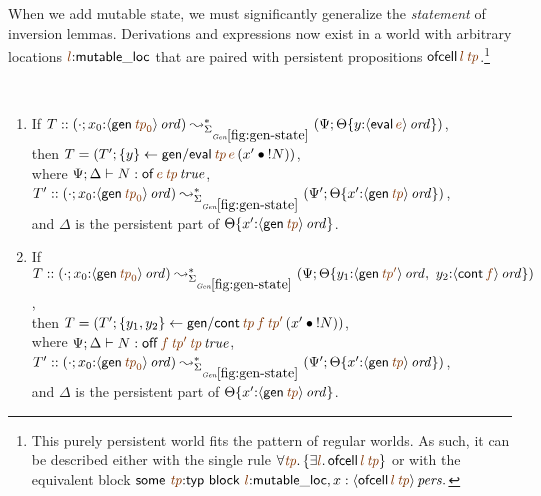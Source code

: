 When we add mutable state, we must significantly generalize the 
{\it statement} of inversion lemmas. Derivations and
expressions now exist in a world with arbitrary locations $\lf{l}{:}{\sf
  mutable\_loc}$ that are paired with persistent propositions
${{\sf ofcell}\,\lf{l}\,\lf{\it tp}}$.\footnote{This purely persistent
world fits the pattern of regular worlds. 
As such, it can be described either with the
single rule
$\forall \lf{\it tp}.\,\{ \exists \lf{l}.\,{\sf
    ofcell}\,\lf{l}\,\lf{\it tp}\}$ or with the equivalent block
${\sf some} ~ \lf{\it tp}{:}{\sf
  typ} ~ {\sf block} ~ \lf{l}{:}{\sf mutable\_loc}, x : \ispers{\susp{{\sf
    ofcell}\,\lf{l}\,\lf{\it tp}}}.$}

\bigskip
\begin{lemma}~
\begin{enumerate}
\item If 
   $T :: (\cdot; x_0{:}\istrue{\susp{{\sf gen}\,\lf{{\it tp}_0}}})
         \leadsto^*_{\siggenstate}
         (\Psi; \tackon{\Theta}
            {y{:}\istrue{\susp{{\sf eval}\,\lf{e}}}})$,
\\ then 
   $T = \left(T'; \trstep{y}{{\sf gen/eval}\,\lf{{\it tp}}\,\lf{e}\,
                                  (\tfuser{x'}{\tbangr{N}})}\right)$,
\\ where
   $\Psi; \Delta \vdash N : \isconc{{{\sf of}\,\lf{e}\,\lf{{\it tp}}}}$,
\\ $T' :: (\cdot; x_0{:}\istrue{\susp{{\sf gen}\,\lf{{\it tp}_0}}})
       \leadsto^*_{\siggenstate}
       (\Psi'; \tackon{\Theta}
          {x'{:}\istrue{\susp{{\sf gen}\,\lf{{\it tp}}}}})$, 
\\ and $\Delta$ is the persistent part of 
   $\tackon{\Theta}
          {x'{:}\istrue{\susp{{\sf gen}\,\lf{{\it tp}}}}}$.
   
\medskip
\item If 
   $T :: (\cdot; x_0{:}\istrue{\susp{{\sf gen}\,\lf{{\it tp}_0}}})
         \leadsto^*_{\siggenstate}
         (\Psi; \tackon{\Theta}
            {y_1{:}\istrue{\susp{{\sf gen}\,\lf{{\it tp}'}}}, ~
             y_2{:}\istrue{\susp{{\sf cont}\,\lf{f}}}})$,
\\ then 
   $T = \left(T'; \trstep{y_1,y_2}
              {{\sf gen/cont}\,\lf{{\it tp}}\,\lf{f}\,\lf{{\it tp}'}\,
                (\tfuser{x'}{\tbangr{N}})}\right)$,
\\ where 
   $\Psi; \Delta \vdash N : 
       \isconc{{{{\sf off}\,\lf{f}\,\lf{{\it tp}'}\,\lf{{\it tp}}}}}$,
\\ $T' :: (\cdot; x_0{:}\istrue{\susp{{\sf gen}\,\lf{{\it tp}_0}}})
       \leadsto^*_{\siggenstate}
       (\Psi'; \tackon{\Theta}
          {x'{:}\istrue{\susp{{\sf gen}\,\lf{{\it tp}}}}})$,
\\ and $\Delta$ is the persistent part of 
   $\tackon{\Theta}
          {x'{:}\istrue{\susp{{\sf gen}\,\lf{{\it tp}}}}}$.



\end{enumerate}
\end{lemma}
